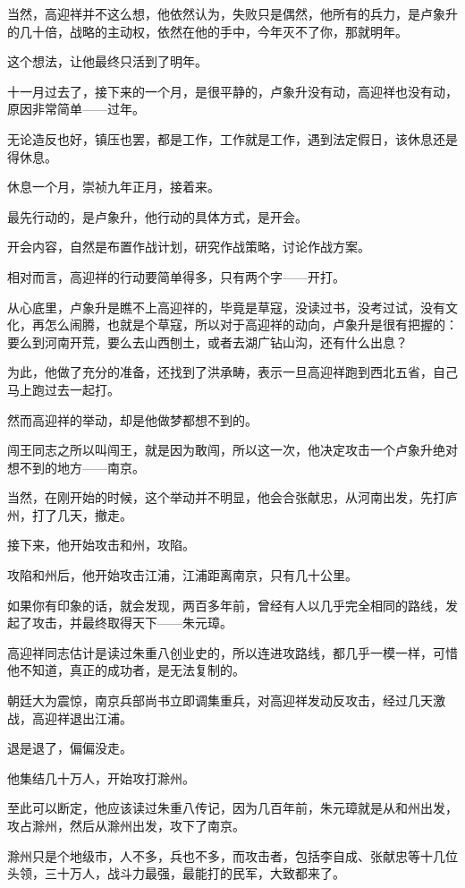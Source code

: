 \begin{multicols}{\theparacolNo}
		当然，高迎祥并不这么想，他依然认为，失败只是偶然，他所有的兵力，是卢象升的几十倍，战略的主动权，依然在他的手中，今年灭不了你，那就明年。

		这个想法，让他最终只活到了明年。

		十一月过去了，接下来的一个月，是很平静的，卢象升没有动，高迎祥也没有动，原因非常简单——过年。

		无论造反也好，镇压也罢，都是工作，工作就是工作，遇到法定假日，该休息还是得休息。

		休息一个月，崇祯九年正月，接着来。

		最先行动的，是卢象升，他行动的具体方式，是开会。

		开会内容，自然是布置作战计划，研究作战策略，讨论作战方案。

		相对而言，高迎祥的行动要简单得多，只有两个字——开打。

		从心底里，卢象升是瞧不上高迎祥的，毕竟是草寇，没读过书，没考过试，没有文化，再怎么闹腾，也就是个草寇，所以对于高迎祥的动向，卢象升是很有把握的：要么到河南开荒，要么去山西刨土，或者去湖广钻山沟，还有什么出息？

		为此，他做了充分的准备，还找到了洪承畴，表示一旦高迎祥跑到西北五省，自己马上跑过去一起打。

		然而高迎祥的举动，却是他做梦都想不到的。

		闯王同志之所以叫闯王，就是因为敢闯，所以这一次，他决定攻击一个卢象升绝对想不到的地方——南京。

		当然，在刚开始的时候，这个举动并不明显，他会合张献忠，从河南出发，先打庐州，打了几天，撤走。

		接下来，他开始攻击和州，攻陷。

		攻陷和州后，他开始攻击江浦，江浦距离南京，只有几十公里。

		如果你有印象的话，就会发现，两百多年前，曾经有人以几乎完全相同的路线，发起了攻击，并最终取得天下——朱元璋。

		高迎祥同志估计是读过朱重八创业史的，所以连进攻路线，都几乎一模一样，可惜他不知道，真正的成功者，是无法复制的。

		朝廷大为震惊，南京兵部尚书立即调集重兵，对高迎祥发动反攻击，经过几天激战，高迎祥退出江浦。

		退是退了，偏偏没走。

		他集结几十万人，开始攻打滁州。

		至此可以断定，他应该读过朱重八传记，因为几百年前，朱元璋就是从和州出发，攻占滁州，然后从滁州出发，攻下了南京。

		滁州只是个地级市，人不多，兵也不多，而攻击者，包括李自成、张献忠等十几位头领，三十万人，战斗力最强，最能打的民军，大致都来了。


\end{multicols}
